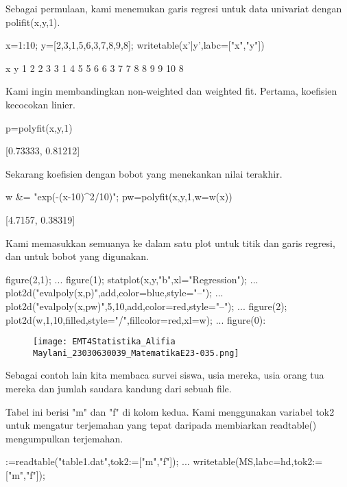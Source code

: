\documentclass{article}
\begin{document}
Sebagai permulaan, kami menemukan garis regresi untuk data univariat
dengan polifit(x,y,1).


\>x=1:10; y=[2,3,1,5,6,3,7,8,9,8]; writetable(x'|y',labc=["x","y"])


             x         y
             1         2
             2         3
             3         1
             4         5
             5         6
             6         3
             7         7
             8         8
             9         9
            10         8

Kami ingin membandingkan non-weighted dan weighted fit. Pertama,
koefisien kecocokan linier.


\>p=polyfit(x,y,1)


    [0.73333,  0.81212]

Sekarang koefisien dengan bobot yang menekankan nilai terakhir.


\>w &= "exp(-(x-10)^2/10)"; pw=polyfit(x,y,1,w=w(x))


    [4.7157,  0.38319]

Kami memasukkan semuanya ke dalam satu plot untuk titik dan garis
regresi, dan untuk bobot yang digunakan.


\>figure(2,1);  ...  
\>   figure(1); statplot(x,y,"b",xl="Regression"); ...  
\>     plot2d("evalpoly(x,p)",\>add,color=blue,style="--"); ...  
\>     plot2d("evalpoly(x,pw)",5,10,\>add,color=red,style="--"); ...  
\>   figure(2); plot2d(w,1,10,\>filled,style="/",fillcolor=red,xl=w); ...  
\>   figure(0):


\begin{figure}
    \centering
    \texttt{[image: EMT4Statistika\_Alifia Maylani\_23030630039\_MatematikaE23-035.png]}
    \caption{}
    \label{fig:enter-label}
\end{figure}

Sebagai contoh lain kita membaca survei siswa, usia mereka, usia orang
tua mereka dan jumlah saudara kandung dari sebuah file.


Tabel ini berisi "m" dan "f" di kolom kedua. Kami menggunakan variabel
tok2 untuk mengatur terjemahan yang tepat daripada membiarkan
readtable() mengumpulkan terjemahan.


:=readtable("table1.dat",tok2:=["m","f"]);  ...  
\>   writetable(MS,labc=hd,tok2:=["m","f"]);
\end{document}
